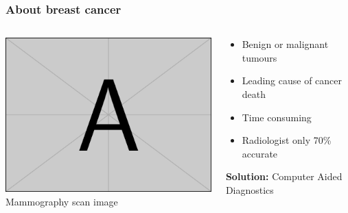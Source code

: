 \documentclass[aspectratio=1610]{beamer}
\begin{document}
\begin{frame}
  \frametitle{\hfill About breast cancer}
  \begin{columns}[T]
    \begin{column}{.5\textwidth}
      \begin{block}{}
        \includegraphics[width=\textwidth]{images/example-image-a.png}\\
        Mammography scan image
      \end{block}
    \end{column}
    \begin{column}{.5\textwidth}
      \begin{block}{}
        \begin{itemize}
          \item Benign or malignant tumours\pause
          \item Leading cause of cancer death\pause
          \item Time consuming\pause
          \item Radiologist only 70\% accurate\pause
        \end{itemize}
        \vspace{0.02\textheight}
        \textbf{Solution:} Computer Aided Diagnostics
      \end{block}
    \end{column}
  \end{columns}
\end{frame}
\end{document}
